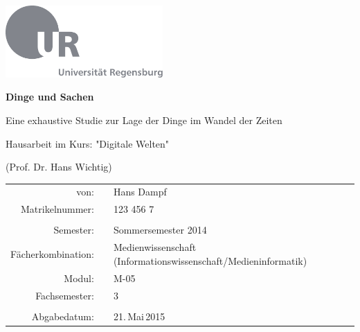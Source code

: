 \documentclass[12pt,ngerman,a4paper,DIV=9,headinclude=true,footinclude=false,titlepage=true,headsepline=true,toc=bibliography,toc=listof]{scrartcl}
\begin{document}
\begin{titlepage}
  \begin{center}

  \hbox{\hspace{2.74cm}\includegraphics[width=0.45\textwidth]{Template/UR-Logo/ur-logo-mit-text.pdf}}

  \vspace{1.8cm}

  {\huge\textbf{Dinge und Sachen}}

    \vspace{0.8cm}
  {\large{Eine exhaustive Studie zur Lage der Dinge im Wandel der Zeiten}}
  
  \vspace{1.5cm}

    Hausarbeit im Kurs: "Digitale Welten"
  
    (Prof. Dr. Hans Wichtig)
  
  \vspace{0.8cm}

  \begin{center}
  \begin{tabular}{ r c l }
  von:               &  & Hans Dampf                                     \\
  Matrikelnummer:    &  & 123 456 7                                \\
                     &  &                                              \\
  Semester:          &  & Sommersemester 2014                                \\
  Fächerkombination: &  & \parbox[t]{6cm}{Medienwissenschaft (Informationswissenschaft/Medieninformatik)}                \\
  Modul:             &  & M-05                                   \\
  Fachsemester:      &  & 3                            \\
                     &  &                                              \\
  Abgabedatum:       &  & 21.\,Mai\,2015
  \end{tabular}
  \end{center}
  \end{center}
\end{titlepage}
\end{document}
